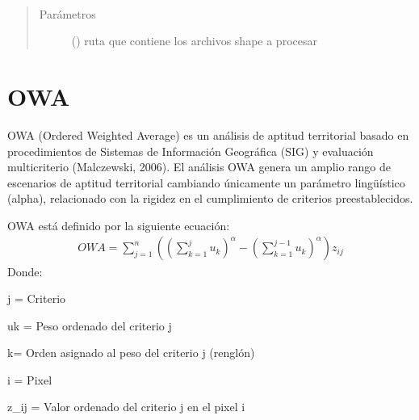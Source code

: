 \documentclass[letterpaper,10pt,spanish]{sphinxmanual}
\begin{document}

\begin{fulllineitems}
\label{\detokenize{leesallee:indice_lee_sallee.lista_shp}}~\begin{quote}\begin{description}
\item[{Parámetros}] \leavevmode
{} () \textendash{} ruta que contiene los archivos shape a procesar

\end{description}\end{quote}

\end{fulllineitems}



\chapter{OWA}
\label{\detokenize{owa:owa}}\label{\detokenize{owa::doc}}
OWA (Ordered Weighted Average) es un análisis de aptitud territorial basado en procedimientos de
Sistemas de Información Geográfica (SIG) y evaluación multicriterio (Malczewski, 2006).
El análisis OWA genera un amplio rango de escenarios de aptitud territorial cambiando únicamente un
parámetro lingüístico (alpha), relacionado con la rigidez en el cumplimiento de criterios preestablecidos.

OWA está definido por la siguiente ecuación:
\begin{equation*}
\begin{split}OWA=\sum_{j=1}^{n}\left (\left( \sum_{k=1}^{j}u_{k}\right )^{\alpha} - \left ( \sum_{k=1}^{j-1}u_{k}\right )^{\alpha} \right )z_{ij}\end{split}
\end{equation*}
Donde:

j = Criterio

uk = Peso ordenado del criterio j

k= Orden asignado al peso del criterio j (renglón)

i = Pixel

z\_ij = Valor ordenado del criterio j en el pixel i
\end{document}
